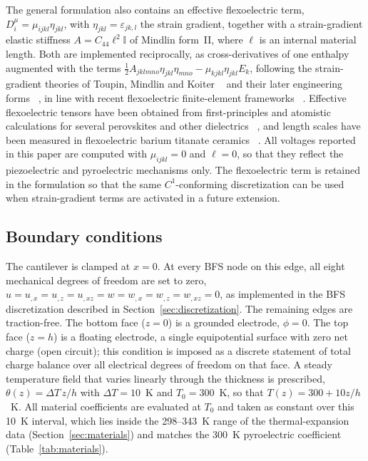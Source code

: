 \documentclass[pdflatex,sn-mathphys-num]{sn-jnl}
\begin{document}
The general formulation also contains an effective flexoelectric term,
$D_i^\mu=\mu_{ijkl}\eta_{jkl}$, with $\eta_{jkl}=\varepsilon_{jk,l}$ the strain
gradient, together with a strain-gradient elastic stiffness
$A=C_{44}\ell^2\mathbb{I}$ of Mindlin form~II, where $\ell$ is an internal material
length. Both are implemented reciprocally, as cross-derivatives of one enthalpy
augmented with the terms
$\tfrac12A_{jklmno}\eta_{jkl}\eta_{mno}-\mu_{kjkl}\eta_{jkl}E_k$, following the
strain-gradient theories of Toupin, Mindlin and Koiter
~\cite{Toupin1962,Mindlin1964,MindlinEshel1968} and their later engineering forms
~\cite{FleckHutchinson1997,Lam2003,AskesAifantis2011}, in line with recent flexoelectric
finite-element frameworks
~\cite{Mao2016,MaoPurohit2014,Abdollahi2014}. Effective flexoelectric tensors have
been obtained from first-principles and atomistic calculations for several perovskites
and other dielectrics
~\cite{MarangantiSharma2009,HongVanderbilt2011,Stengel2013}, and length scales have
been measured in flexoelectric barium titanate ceramics
~\cite{MaCross2006,Huang2007}. All voltages reported in this paper are computed with
$\mu_{ijkl}=0$ and $\ell=0$, so that they reflect the piezoelectric and pyroelectric
mechanisms only. The flexoelectric term is retained in the formulation so that the
same $C^1$-conforming discretization can be used when strain-gradient terms are
activated in a future extension.

\subsection{Boundary conditions}
\label{sec:bcs}

The cantilever is clamped at $x=0$. At every BFS node on this edge, all eight mechanical
degrees of freedom are set to zero,
$u=u_{,x}=u_{,z}=u_{,xz}=w=w_{,x}=w_{,z}=w_{,xz}=0$, as implemented in the BFS
discretization described in Section~\ref{sec:discretization}. The remaining edges are
traction-free. The bottom face ($z=0$) is a grounded electrode, $\phi=0$. The top face
($z=h$) is a floating electrode, a single equipotential surface with zero net charge
(open circuit); this condition is imposed as a discrete statement of total charge
balance over all electrical degrees of freedom on that face. A steady temperature field
that varies linearly through the thickness is prescribed,
$\theta(z)=\Delta T\,z/h$ with $\Delta T=10$~K and $T_0=300$~K, so that
$T(z)=300+10z/h$~K. All material coefficients are evaluated at $T_0$ and taken as
constant over this 10~K interval, which lies inside the 298--343~K range of the
thermal-expansion data (Section~\ref{sec:materials}) and matches the 300~K
pyroelectric coefficient (Table~\ref{tab:materials}).
\end{document}
